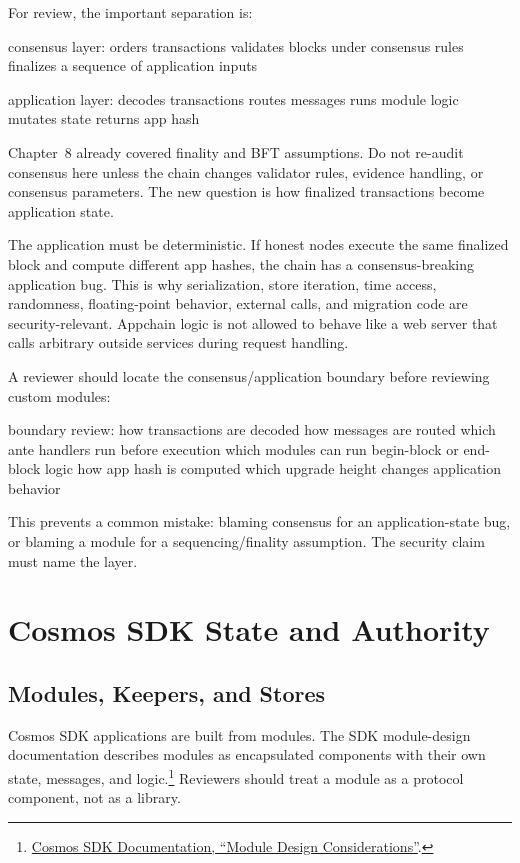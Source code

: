 For review, the important separation is:

\begin{codeblock}
consensus layer:
    orders transactions
    validates blocks under consensus rules
    finalizes a sequence of application inputs

application layer:
    decodes transactions
    routes messages
    runs module logic
    mutates state
    returns app hash
\end{codeblock}

Chapter~8 already covered finality and BFT assumptions. Do not re-audit consensus here unless the chain changes validator rules, evidence handling, or consensus parameters. The new question is how finalized transactions become application state.

The application must be deterministic. If honest nodes execute the same finalized block and compute different app hashes, the chain has a consensus-breaking application bug. This is why serialization, store iteration, time access, randomness, floating-point behavior, external calls, and migration code are security-relevant. Appchain logic is not allowed to behave like a web server that calls arbitrary outside services during request handling.

A reviewer should locate the consensus/application boundary before reviewing custom modules:

\begin{codeblock}
boundary review:
    how transactions are decoded
    how messages are routed
    which ante handlers run before execution
    which modules can run begin-block or end-block logic
    how app hash is computed
    which upgrade height changes application behavior
\end{codeblock}

This prevents a common mistake: blaming consensus for an application-state bug, or blaming a module for a sequencing/finality assumption. The security claim must name the layer.

\section{Cosmos SDK State and Authority}

\subsection{Modules, Keepers, and Stores}

Cosmos SDK applications are built from modules. The SDK module-design documentation describes modules as encapsulated components with their own state, messages, and logic.\footnote{\href{https://docs.cosmos.network/sdk/latest/guides/module-design/module-design-considerations}{Cosmos SDK Documentation, ``Module Design Considerations''}.} Reviewers should treat a module as a protocol component, not as a library.

